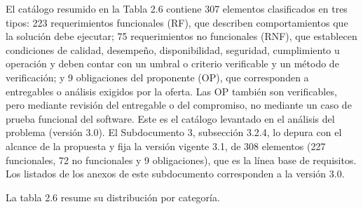 \documentclass[11pt]{article}
\begin{document}
El catálogo resumido en la Tabla 2.6 contiene 307 elementos clasificados en tres tipos: 223 requerimientos funcionales (RF), que describen comportamientos que la solución debe ejecutar; 75 requerimientos no funcionales (RNF), que establecen condiciones de calidad, desempeño, disponibilidad, seguridad, cumplimiento u operación y deben contar con un umbral o criterio verificable y un método de verificación; y 9 obligaciones del proponente (OP), que corresponden a entregables o análisis exigidos por la oferta. Las OP también son verificables, pero mediante revisión del entregable o del compromiso, no mediante un caso de prueba funcional del software. Este es el catálogo levantado en el análisis del problema (versión 3.0). El Subdocumento 3, subsección 3.2.4, lo depura con el alcance de la propuesta y fija la versión vigente 3.1, de 308 elementos (227 funcionales, 72 no funcionales y 9 obligaciones), que es la línea base de requisitos. Los listados de los anexos de este subdocumento corresponden a la versión 3.0.

La tabla 2.6 resume su distribución por categoría.
\end{document}
